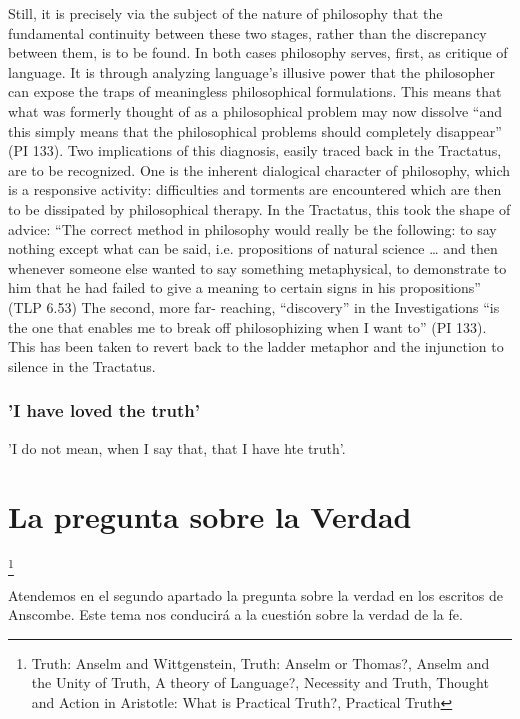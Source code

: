 \documentclass[../main.tex]{subfiles}
\begin{document}
Still, it is precisely via the subject of the nature of philosophy that the fundamental continuity between these two stages, rather than the discrepancy between them, is to be found. In both cases philosophy serves, first, as critique of language. It is through analyzing language's illusive power that the philosopher can expose the traps of meaningless philosophical formulations. This means that what was formerly thought of as a philosophical problem may now dissolve “and this simply means that the philosophical problems should completely disappear” (PI 133). Two implications of this diagnosis, easily traced back in the Tractatus, are to be recognized. One is the inherent dialogical character of philosophy, which is a responsive activity: difficulties and torments are encountered which are then to be dissipated by philosophical therapy. In the Tractatus, this took the shape of advice: “The correct method in philosophy would really be the following: to say nothing except what can be said, i.e. propositions of natural science … and then whenever someone else wanted to say something metaphysical, to demonstrate to him that he had failed to give a meaning to certain signs in his propositions” (TLP 6.53) The second, more far- reaching, “discovery” in the Investigations “is the one that enables me to break off philosophizing when I want to” (PI 133). This has been taken to revert back to the ladder metaphor and the injunction to silence in the Tractatus.

\subsubsection{'I have loved the truth'}

'I do not mean, when I say that, that I have hte truth'.

\section{La pregunta sobre la Verdad}
\footnote{
Truth: Anselm and Wittgenstein, 
Truth: Anselm or Thomas?, 
Anselm and the Unity of Truth, 
A theory of Language?, 
Necessity and Truth, 
Thought and Action in Aristotle: What is Practical Truth?, 
Practical Truth
}

Atendemos en el segundo apartado la pregunta sobre la verdad en los escritos de Anscombe. Este tema nos conducirá a la cuestión sobre la verdad de la fe.
\end{document}
